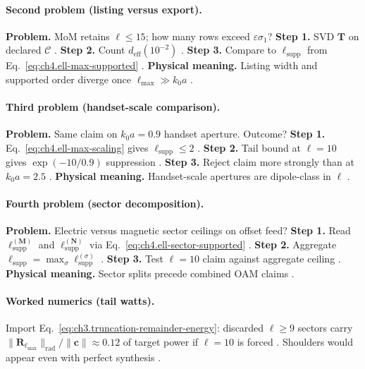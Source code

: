 \paragraph{Second problem (listing versus export).}
\textbf{Problem.} MoM retains \(\ell\le15\); how many rows exceed \(\varepsilon\sigma_{1}\)?
\textbf{Step 1.} SVD \(\mathbf{T}\) on declared \(\mathcal{C}\) \cite{harrington2001,hansen1988}.
\textbf{Step 2.} Count \(d_{\mathrm{eff}}(10^{-2})\) \cite{devaney2004,stratton1941}.
\textbf{Step 3.} Compare to \(\ell_{\mathrm{supp}}\) from Eq.~\eqref{eq:ch4.ell-max-supported} \cite{jackson1999,hansen1988}.
\textbf{Physical meaning.} Listing width and supported order diverge once \(\ell_{\max}\gg k_{0}a\) \cite{harrington2001,stratton1941}.

\paragraph{Third problem (handset-scale comparison).}
\textbf{Problem.} Same claim on \(k_{0}a=0.9\) handset aperture. Outcome?
\textbf{Step 1.} Eq.~\eqref{eq:ch4.ell-max-scaling} gives \(\ell_{\mathrm{supp}}\le2\) \cite{hansen1988,jackson1999,harrington2001}.
\textbf{Step 2.} Tail bound at \(\ell=10\) gives \(\exp(-10/0.9)\) suppression \cite{stratton1941,devaney2004}.
\textbf{Step 3.} Reject claim more strongly than at \(k_{0}a=2.5\) \cite{harrington2001,hansen1988}.
\textbf{Physical meaning.} Handset-scale apertures are dipole-class in \(\ell\) \cite{jackson1999,stratton1941}.

\paragraph{Fourth problem (sector decomposition).}
\textbf{Problem.} Electric versus magnetic sector ceilings on offset feed?
\textbf{Step 1.} Read \(\ell_{\mathrm{supp}}^{(\mathbf{M})}\) and \(\ell_{\mathrm{supp}}^{(\mathbf{N})}\) via Eq.~\eqref{eq:ch4.ell-sector-supported} \cite{harrington2001,hansen1988}.
\textbf{Step 2.} Aggregate \(\ell_{\mathrm{supp}}=\max_{\sigma}\ell_{\mathrm{supp}}^{(\sigma)}\) \cite{stratton1941,devaney2004}.
\textbf{Step 3.} Test \(\ell=10\) claim against aggregate ceiling \cite{jackson1999,harrington2001}.
\textbf{Physical meaning.} Sector splits precede combined OAM claims \cite{hansen1988,stratton1941}.

\paragraph{Worked numerics (tail watts).}
Import Eq.~\eqref{eq:ch3.truncation-remainder-energy}: discarded \(\ell\ge9\) sectors carry \(\|\mathbf{R}_{\ell_{\max}}\|_{\mathrm{rad}}/\|\mathbf{c}\|\approx0.12\) of
target power if \(\ell=10\) is forced \cite{hansen1988,harrington2001,stratton1941,devaney2004,jackson1999}. Shoulders would appear even with perfect synthesis
\cite{harrington2001}.

